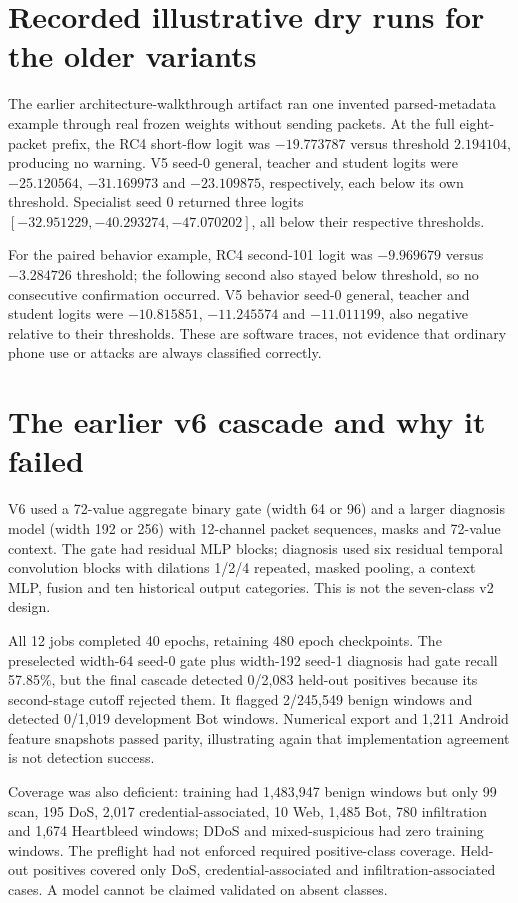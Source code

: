 \documentclass[11pt,a4paper,oneside]{report}
\begin{document}
\section{Recorded illustrative dry runs for the older variants}
The earlier architecture-walkthrough artifact ran one invented parsed-metadata example through real frozen weights without sending packets. At the full eight-packet prefix, the RC4 short-flow logit was $-19.773787$ versus threshold $2.194104$, producing no warning. V5 seed-0 general, teacher and student logits were $-25.120564$, $-31.169973$ and $-23.109875$, respectively, each below its own threshold. Specialist seed 0 returned three logits $[-32.951229,-40.293274,-47.070202]$, all below their respective thresholds.

For the paired behavior example, RC4 second-101 logit was $-9.969679$ versus $-3.284726$ threshold; the following second also stayed below threshold, so no consecutive confirmation occurred. V5 behavior seed-0 general, teacher and student logits were $-10.815851$, $-11.245574$ and $-11.011199$, also negative relative to their thresholds. These are software traces, not evidence that ordinary phone use or attacks are always classified correctly.

\section{The earlier v6 cascade and why it failed}
V6 used a 72-value aggregate binary gate (width 64 or 96) and a larger diagnosis model (width 192 or 256) with 12-channel packet sequences, masks and 72-value context. The gate had residual MLP blocks; diagnosis used six residual temporal convolution blocks with dilations 1/2/4 repeated, masked pooling, a context MLP, fusion and ten historical output categories. This is not the seven-class v2 design.

All 12 jobs completed 40 epochs, retaining 480 epoch checkpoints. The preselected width-64 seed-0 gate plus width-192 seed-1 diagnosis had gate recall 57.85\%, but the final cascade detected 0/2,083 held-out positives because its second-stage cutoff rejected them. It flagged 2/245,549 benign windows and detected 0/1,019 development Bot windows. Numerical export and 1,211 Android feature snapshots passed parity, illustrating again that implementation agreement is not detection success.

Coverage was also deficient: training had 1,483,947 benign windows but only 99 scan, 195 DoS, 2,017 credential-associated, 10 Web, 1,485 Bot, 780 infiltration and 1,674 Heartbleed windows; DDoS and mixed-suspicious had zero training windows. The preflight had not enforced required positive-class coverage. Held-out positives covered only DoS, credential-associated and infiltration-associated cases. A model cannot be claimed validated on absent classes.
\end{document}
